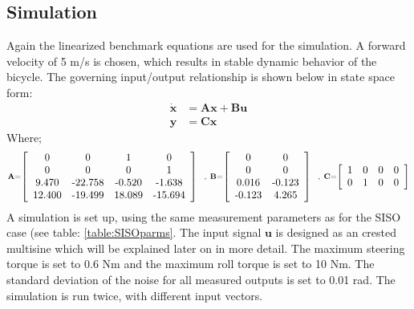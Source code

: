\subsection{Simulation}
Again the linearized benchmark equations are used for the simulation. A forward velocity of 5 m/s is chosen, which results in stable dynamic behavior of the bicycle. The governing input/output relationship is shown below in state space form:
	\begin{align}
		\mathbf{\dot{x}} & = \mathbf{A}\mathbf{x} + \mathbf{B}\mathbf{u} \nonumber \\
		\mathbf{y} & = \mathbf{C}\mathbf{x} 
	\end{align}
Where;
	\begin{align}
	{\scriptstyle
			\mathbf{A} =   \left[\begin{array}{cccc} 
									$0$ & $0$ & $1$ & $0$ \\
									$0$ & $0$ & $0$ & $1$ \\
									$9.470$ & $-22.758$ & $-0.520$ & $-1.638$ \\
									$12.400$ & $-19.499$ & $18.089$ & $-15.694$   
			\end{array}\right]   \nonumber \ \ , \
			\mathbf{B} = \left[\begin{array}{cc}
									 $0$ & $0$ \\
									$0$ & $0$ \\
									$0.016$ & $-0.123$ \\
									$-0.123$ & $4.265$ 
			\end{array}\right] \nonumber \ \ , \ 
			\mathbf{C} = \left[\begin{array}{cccc}
									$1$ & $0$ & $0$ & $0$ \\
									$0$ & $1$ & $0$ & $0$
			\end{array}\right]  \nonumber
	}
	\end{align}
A simulation is set up, using the same measurement parameters as for the SISO case (see table: \ref{table:SISOparms}. The input signal $\mathbf{u}$ is designed as an crested multisine which will be explained later on in more detail. The maximum steering torque is set to 0.6 Nm and the maximum roll torque is set to 10 Nm. The standard deviation of the noise for all measured outputs is set to 0.01 rad. The simulation is run twice, with different input vectors. 
